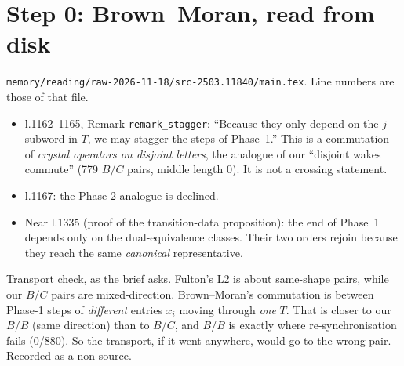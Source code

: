 \documentclass[11pt]{article}
\theoremstyle{definition}\newtheorem{definition}[theorem]{Definition}\newtheorem{remark}[theorem]{Remark}
\begin{document}
\section{Step 0: Brown--Moran, read from disk}\label{sec:bm}
\texttt{memory/reading/raw-2026-11-18/src-2503.11840/main.tex}. Line numbers are those of that file.
\begin{itemize}
\item l.1162--1165, Remark \texttt{remark\_stagger}: ``Because they only depend on the $j$-subword in $T$, we may stagger the steps of Phase~1.''
This is a commutation of \emph{crystal operators on disjoint letters}, the analogue of our ``disjoint wakes commute'' (779 $B/C$ pairs, middle length 0). It is not a crossing statement.
\item l.1167: the Phase-2 analogue is declined.
\item Near l.1335 (proof of the transition-data proposition): the end of Phase~1 depends only on the dual-equivalence classes. Their two orders rejoin because they reach the same \emph{canonical} representative.
\end{itemize}
Transport check, as the brief asks. Fulton's L2 is about same-shape pairs, while our $B/C$ pairs are mixed-direction. Brown--Moran's commutation is between Phase-1 steps of \emph{different} entries $x_i$ moving through \emph{one} $T$.
That is closer to our $B/B$ (same direction) than to $B/C$, and $B/B$ is exactly where re-synchronisation fails (0/880). So the transport, if it went anywhere, would go to the wrong pair. Recorded as a non-source.
\end{document}
